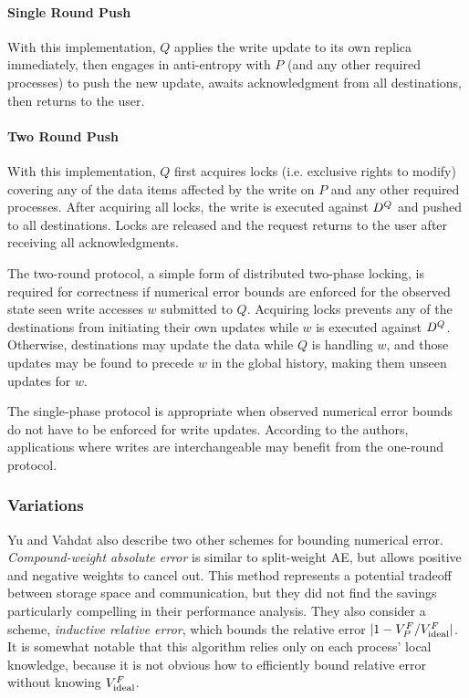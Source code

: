 \documentclass[]             %
{NASA}                       %
\theoremstyle{definition}
\begin{document}
\paragraph{Single Round Push} With this implementation, $Q$ applies
the write update to its own replica immediately, then engages in
anti-entropy with $P$ (and any other required processes) to push the
new update, awaits acknowledgment from all destinations, then returns
to the user.

\paragraph{Two Round Push} With this implementation, $Q$ first
acquires locks (i.e. exclusive rights to modify) covering any of the
data items affected by the write on $P$ and any other required
processes. After acquiring all locks, the write is executed against
$D^{Q}$ and pushed to all destinations. Locks are released and
the request returns to the user after receiving all acknowledgments.

The two-round protocol, a simple form of distributed two-phase
locking, is required for correctness if numerical error bounds are
enforced for the observed state seen write accesses $w$ submitted to
$Q$. Acquiring locks prevents any of the destinations from initiating
their own updates while $w$ is executed against
$D^{Q}$. Otherwise, destinations may update the data while $Q$ is
handling $w$, and those updates may be found to precede $w$ in the
global history, making them unseen updates for $w$.

The single-phase protocol is appropriate when observed numerical error
bounds do not have to be enforced for write updates.  According to the
authors, applications where writes are interchangeable may benefit
from the one-round protocol.

\subsubsection{Variations}
Yu and Vahdat also describe two other schemes
for bounding numerical error. \emph{Compound-weight absolute error} is
similar to split-weight AE, but allows positive and negative weights
to cancel out. This method represents a potential tradeoff between
storage space and communication, but they did not find the savings
particularly compelling in their performance analysis. They also
consider a scheme, \emph{inductive relative error}, which bounds the
relative error $|1 - V^F_P / V^{F}_{\textrm{ideal}} |$. It is somewhat notable
that this algorithm relies only on each process' local knowledge,
because it is not obvious how to efficiently bound relative error
without knowing $V^{F}_{\textrm{ideal}}$.
\end{document}
